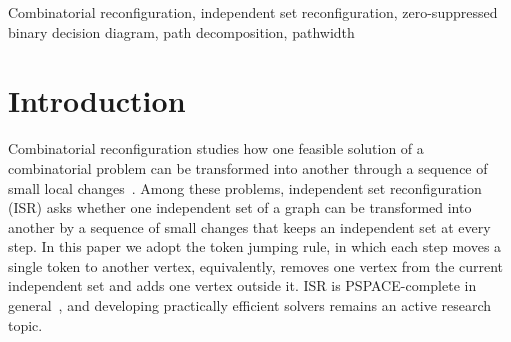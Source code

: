 \documentclass[conference]{IEEEtran}
\begin{document}
\begin{abstract}
Zero-suppressed binary decision diagrams (ZDDs) are a standard data structure for
compactly representing families of combinatorial solutions, and controlling the
pathwidth of the input graph is known to be effective for keeping ZDDs small when
they are constructed.
In combinatorial reconfiguration, however, a ZDD-based solver must build a
solution-space ZDD and then repeatedly perform transition computations on top of
it, and how much pathwidth affects the end-to-end performance of such solvers has
remained unclear.
This paper studies path decomposition as a preprocessing step for the ZDD-based
independent set reconfiguration (ISR) solver \textsc{ddreconf} under the token
jumping rule.
By reordering the input edges according to a computed path decomposition, we
shrink the solution-space ZDD and improve the overall performance of
\textsc{ddreconf}, without modifying the solver itself.
Computational experiments on two variants of the problem, the shortest and the
farthest variant, show that the preprocessing consistently reduces ZDD size,
memory usage, and running time, and increases the number of instances solved
within the time limit.
Moreover, computing an optimal path decomposition is unnecessary in practice: a
fast heuristic decomposition attains essentially the same width and the same
gains, and on large instances, for which the optimal pathwidth cannot be computed
in reasonable time, the heuristic is the only option that lets the solver reach
them.
\end{abstract}

\begin{IEEEkeywords}
Combinatorial reconfiguration, independent set reconfiguration, zero-suppressed binary decision diagram, path decomposition, pathwidth
\end{IEEEkeywords}

\section{Introduction}
Combinatorial reconfiguration studies how one feasible solution of a
combinatorial problem can be transformed into another through a sequence of small
local changes~\cite{nishimura18}.
Among these problems, independent set reconfiguration (ISR) asks whether one
independent set of a graph can be transformed into another by a sequence of small
changes that keeps an independent set at every step.
In this paper we adopt the token jumping rule, in which each step moves a single
token to another vertex, equivalently, removes one vertex from the current
independent set and adds one vertex outside it.
ISR is PSPACE-complete in general~\cite{kamemi12,itdehapasiueun11}, and developing
practically efficient solvers remains an active research topic.
\end{document}
